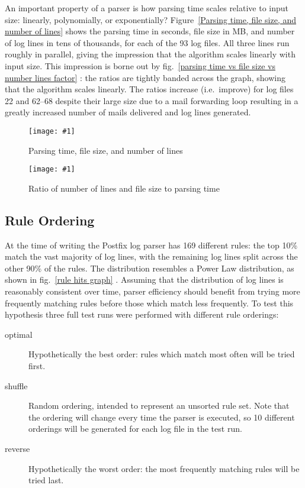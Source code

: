 \documentclass{svmult}
\newcommand{\showgraph}[3]{%
    \begin{figure}[btp]%
        \texttt{[image: \#1]}%
        \caption{#2}\label{#3}%
    \end{figure}%
}
\newcommand{\refwithlabel}[2]{%
    #1~\vref{#2}%
}
\newcommand{\graphref}[1]{%
    \refwithlabel{fig.}{#1}%
}
\newcommand{\Graphref}[1]{%
    \refwithlabel{Figure}{#1}%
}
\newcommand{\numberOFlogFILES}[0]{%
    93%
}
\newcommand{\numberOFrules}[0]{%
    169%
}
\begin{document}
An important property of a parser is how parsing time scales relative to
input size: linearly, polynomially, or exponentially?  \Graphref{Parsing
time, file size, and number of lines} shows the parsing time in seconds,
file size in MB, and number of log lines in tens of thousands, for each of
the \numberOFlogFILES{} log files.  All three lines run roughly in
parallel, giving the impression that the algorithm scales linearly with
input size.  This impression is borne out by \graphref{parsing time vs file
size vs number lines factor}: the ratios are tightly banded across the
graph, showing that the algorithm scales linearly.  The ratios increase
(i.e.\ improve) for log files 22 and 62--68 despite their large size due to
a mail forwarding loop resulting in a greatly increased number of mails
delivered and log lines generated.

\showgraph{build/graph-input-size-vs-parsing-time}{Parsing time, file size,
and number of lines}{Parsing time, file size, and number of lines}
\showgraph{build/graph-input-size-vs-parsing-time-ratio}{Ratio of number of
lines and file size to parsing time}{parsing time vs file size vs number
lines factor}

\subsection{Rule Ordering}

\label{Rule ordering}

At the time of writing the Postfix log parser has \numberOFrules{}
different rules: the top 10\% match the vast majority of log lines, with
the remaining log lines split across the other 90\% of the rules.  The
distribution resembles a Power Law distribution, as shown in \graphref{rule
hits graph}.  Assuming that the distribution of log lines is reasonably
consistent over time, parser efficiency should benefit from trying more
frequently matching rules before those which match less frequently.  To
test this hypothesis three full test runs were performed with different
rule orderings:

\begin{description}

    \item [optimal]  Hypothetically the best order: rules which match most
        often will be tried first.

    \item [shuffle] Random ordering, intended to represent an unsorted rule
        set.  Note that the ordering will change every time the parser is
        executed, so 10 different orderings will be generated for each log
        file in the test run.

    \item [reverse] Hypothetically the worst order: the most frequently
        matching rules will be tried last.

\end{description}
\end{document}
